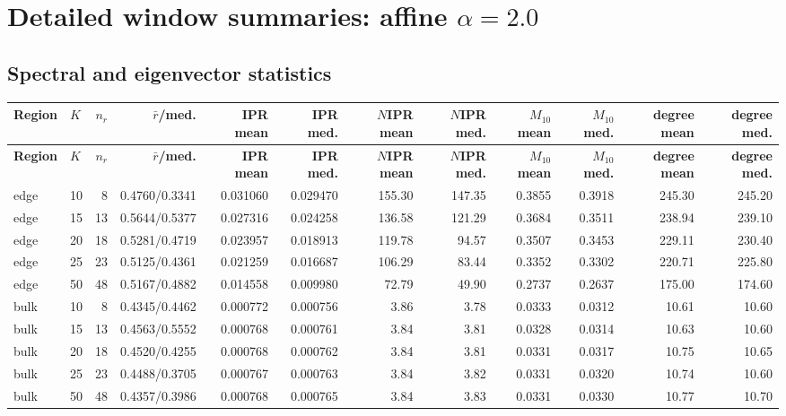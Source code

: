 \documentclass[10pt,letterpaper]{article}
\newcommand{\Hdr}[1]{\cellcolor{navy}\color{white}\bfseries #1}
\begin{document}
\section{Detailed window summaries: affine $\alpha=2.0$}
\subsection{Spectral and eigenvector statistics}\scriptsize\setlength{\tabcolsep}{1.2pt}
\begin{longtable}{|l|l|r|r|r|r|r|r|r|r|r|r|}\hline
\Hdr{Region} & \Hdr{$K$} & \Hdr{$n_r$} & \Hdr{$\bar r$/med.} & \Hdr{IPR mean} & \Hdr{IPR med.} & \Hdr{$N$IPR mean} & \Hdr{$N$IPR med.} & \Hdr{$M_{10}$ mean} & \Hdr{$M_{10}$ med.} & \Hdr{degree mean} & \Hdr{degree med.}\\\hline\endfirsthead
\hline \Hdr{Region} & \Hdr{$K$} & \Hdr{$n_r$} & \Hdr{$\bar r$/med.} & \Hdr{IPR mean} & \Hdr{IPR med.} & \Hdr{$N$IPR mean} & \Hdr{$N$IPR med.} & \Hdr{$M_{10}$ mean} & \Hdr{$M_{10}$ med.} & \Hdr{degree mean} & \Hdr{degree med.}\\\hline\endhead
edge & 10 & 8 & 0.4760/0.3341 & 0.031060 & 0.029470 & 155.30 & 147.35 & 0.3855 & 0.3918 & 245.30 & 245.20 \\\hline
edge & 15 & 13 & 0.5644/0.5377 & 0.027316 & 0.024258 & 136.58 & 121.29 & 0.3684 & 0.3511 & 238.94 & 239.10 \\\hline
edge & 20 & 18 & 0.5281/0.4719 & 0.023957 & 0.018913 & 119.78 & 94.57 & 0.3507 & 0.3453 & 229.11 & 230.40 \\\hline
edge & 25 & 23 & 0.5125/0.4361 & 0.021259 & 0.016687 & 106.29 & 83.44 & 0.3352 & 0.3302 & 220.71 & 225.80 \\\hline
edge & 50 & 48 & 0.5167/0.4882 & 0.014558 & 0.009980 & 72.79 & 49.90 & 0.2737 & 0.2637 & 175.00 & 174.60 \\\hline
\hline
bulk & 10 & 8 & 0.4345/0.4462 & 0.000772 & 0.000756 & 3.86 & 3.78 & 0.0333 & 0.0312 & 10.61 & 10.60 \\\hline
bulk & 15 & 13 & 0.4563/0.5552 & 0.000768 & 0.000761 & 3.84 & 3.81 & 0.0328 & 0.0314 & 10.63 & 10.60 \\\hline
bulk & 20 & 18 & 0.4520/0.4255 & 0.000768 & 0.000762 & 3.84 & 3.81 & 0.0331 & 0.0317 & 10.75 & 10.65 \\\hline
bulk & 25 & 23 & 0.4488/0.3705 & 0.000767 & 0.000763 & 3.84 & 3.82 & 0.0331 & 0.0320 & 10.74 & 10.60 \\\hline
bulk & 50 & 48 & 0.4357/0.3986 & 0.000768 & 0.000765 & 3.84 & 3.83 & 0.0331 & 0.0330 & 10.77 & 10.70 \\\hline
\hline
\hline\end{longtable}
\end{document}
